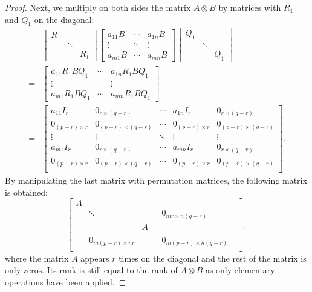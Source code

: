 \documentclass[11pt]{article}
\newcommand{\kp}{\otimes} %
\begin{document}
\begin{proof}
Next, we multiply on both sides the matrix $A\kp B$ by matrices with $R_1$ and $Q_1$ on the diagonal:
\begin{align*}
    &\begin{bmatrix}
    R_1 & &\\
    & \ddots & \\
    & & R_1
    \end{bmatrix}
    \begin{bmatrix}
    a_{11}B & \cdots & a_{1n}B\\
    \vdots & \ddots & \vdots\\
    a_{m1}B & \cdots & a_{mn}B
    \end{bmatrix}
    \begin{bmatrix}
    Q_1 & &\\
    & \ddots & \\
    & & Q_1
    \end{bmatrix}\\
    = &\begin{bmatrix}
    a_{11}R_1BQ_1 & \cdots & a_{1n}R_1BQ_1\\
    \vdots & & \vdots\\
    a_{m1}R_1BQ_1 & \cdots & a_{mn}R_1BQ_1
    \end{bmatrix}\\
    = &\begin{bmatrix}
    a_{11}I_r & 0_{r \times (q - r)} & \cdots & a_{1n}I_r & 0_{r \times (q-r)}\\
    0_{(p-r) \times r} & 0_{(p-r) \times (q-r)} & \cdots & 0_{(p-r) \times r} & 0_{(p-r) \times (q-r)}\\
    \vdots & \vdots & \ddots & \vdots & \vdots\\
    a_{m1}I_r & 0_{r \times (q - r)} & \cdots & a_{mn}I_r & 0_{r \times (q - r)}\\
    0_{(p-r) \times r} & 0_{(p-r) \times (q-r)}& \cdots & 0_{(p-r) \times r} & 0_{(p-r) \times (q-r)}\\
    \end{bmatrix}.
\end{align*}
By manipulating the last matrix with permutation matrices, the following matrix is obtained:
\[
    \begin{bmatrix}
    A & & & & &\\
    & \ddots & & & 0_{mr \times n(q-r)} &\\
    & & A & & & \\
    & & & & &\\
    & 0_{m(p-r) \times nr} & & & 0_{m(p-r) \times n(q-r)} &\\
    & & & & &
    \end{bmatrix},
\]
where the matrix \(A\) appears \(r\) times on the diagonal and the rest of the matrix is only zeros. 
Its rank is still equal to the rank of $A\kp B$ as only elementary operations have been applied.


\end{proof}
\end{document}
